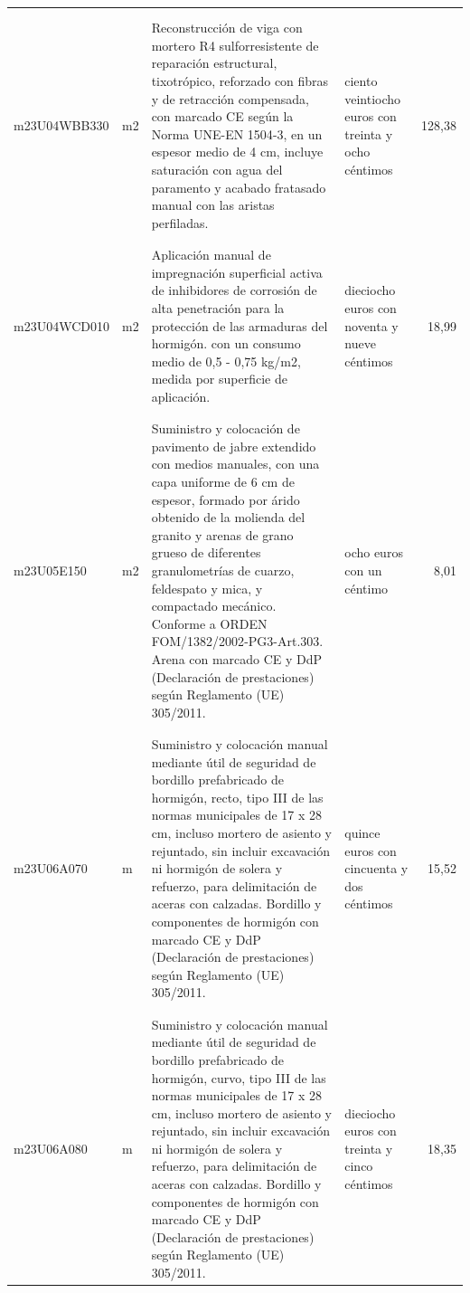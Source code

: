 \documentclass{book}%
\begin{document}
\begin{supertabular}{|l|l|p{5cm}|p{3cm}|r|}
&&&&\\%
&&&&\\%
m23U04WBB330&m2&Reconstrucción de viga con mortero R4 sulforresistente de reparación estructural, tixotrópico, reforzado con fibras y de retracción compensada, con marcado CE según la Norma UNE{-}EN 1504{-}3, en un espesor medio de 4 cm, incluye saturación con agua del paramento y acabado fratasado manual con las aristas perfiladas.&ciento veintiocho euros con treinta y ocho céntimos&128,38\\%
&&&&\\%
&&&&\\%
m23U04WCD010&m2&Aplicación manual de impregnación superficial activa de inhibidores de corrosión de alta penetración para la protección de las armaduras del hormigón. con un consumo medio de 0,5 {-} 0,75 kg/m2, medida por superficie de aplicación.&dieciocho euros con noventa y nueve céntimos&18,99\\%
&&&&\\%
&&&&\\%
m23U05E150&m2&Suministro y colocación de pavimento de jabre extendido con medios manuales, con una capa uniforme de 6 cm de espesor, formado por árido obtenido de la molienda del granito y arenas de grano grueso de diferentes granulometrías de cuarzo, feldespato y mica, y compactado mecánico. Conforme a ORDEN FOM/1382/2002{-}PG3{-}Art.303. Arena con marcado CE y DdP (Declaración de prestaciones) según Reglamento (UE) 305/2011.&ocho euros con un céntimo&8,01\\%
&&&&\\%
&&&&\\%
m23U06A070&m&Suministro y colocación manual mediante útil de seguridad de bordillo prefabricado de hormigón, recto, tipo III de las normas municipales de 17 x 28 cm, incluso mortero de asiento y rejuntado, sin incluir excavación ni hormigón de solera y refuerzo, para delimitación de aceras con calzadas. Bordillo y componentes de hormigón con marcado CE y DdP (Declaración de prestaciones) según Reglamento (UE) 305/2011.&quince euros con cincuenta y dos céntimos&15,52\\%
&&&&\\%
&&&&\\%
m23U06A080&m&Suministro y colocación manual mediante útil de seguridad de bordillo prefabricado de hormigón, curvo, tipo III de las normas municipales de 17 x 28 cm, incluso mortero de asiento y rejuntado, sin incluir excavación ni hormigón de solera y refuerzo, para delimitación de aceras con calzadas. Bordillo y componentes de hormigón con marcado CE y DdP (Declaración de prestaciones) según Reglamento (UE) 305/2011.&dieciocho euros con treinta y cinco céntimos&18,35\\%

\end{supertabular}
\end{document}
